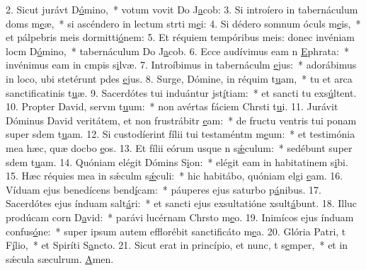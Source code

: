2. Sicut jurávt D\uline{ó}mino,~* votum vovit Do J\uline{a}cob:
3. Si introíero in tabernáculum doms m\uline{e}æ,~* si ascéndero in lectum strti m\uline{e}i:
4. Si dédero somnum óculs m\uline{e}is,~* et pálpebris meis dormitti\uline{ó}nem:
5. Et réquiem tempóribus meis: donec invéniam locm D\uline{ó}mino,~* tabernáculum Do J\uline{a}cob.
6. Ecce audívimus eam n \uline{E}phrata:~* invénimus eam in cmpis s\uline{i}lvæ.
7. Introíbimus in tabernáculm \uline{e}jus:~* adorábimus in loco, ubi stetérunt pdes \uline{e}jus.
8. Surge, Dómine, in réquim t\uline{u}am,~* tu et arca sanctificatinis t\uline{u}æ.
9. Sacerdótes tui induántur jst\uline{í}tiam:~* et sancti tu exs\uline{ú}ltent.
10. Propter David, servm t\uline{u}um:~* non avértas fáciem Chrsti t\uline{u}i.
11. Jurávit Dóminus David veritátem, et non frustrábitr \uline{e}am:~* de fructu ventris tui ponam super sdem t\uline{u}am.
12. Si custodíerint fílii tui testaméntm m\uline{e}um:~* et testimónia mea hæc, quæ docbo \uline{e}os.
13. Et fílii eórum usque n s\uline{ǽ}culum:~* sedébunt super sdem t\uline{u}am.
14. Quóniam elégit Dómins S\uline{i}on:~* elégit eam in habitatinem s\uline{i}bi.
15. Hæc réquies mea in sǽculm s\uline{ǽ}culi:~* hic habitábo, quóniam elgi \uline{e}am.
16. Víduam ejus benedícens bend\uline{í}cam:~* páuperes ejus saturbo p\uline{á}nibus.
17. Sacerdótes ejus índuam salt\uline{á}ri:~* et sancti ejus exsultatióne xsult\uline{á}bunt.
18. Illuc prodúcam corn D\uline{a}vid:~* parávi lucérnam Chrsto m\uline{e}o.
19. Inimícos ejus índuam confus\uline{ó}ne:~* super ipsum autem efflorébit sanctificáto m\uline{e}a.
20. Glória Patri, t F\uline{í}lio,~* et Spiríti S\uline{a}ncto.
21. Sicut erat in princípio, et nunc, t s\uline{e}mper,~* et in sǽcula sæculrum. \uline{A}men.
